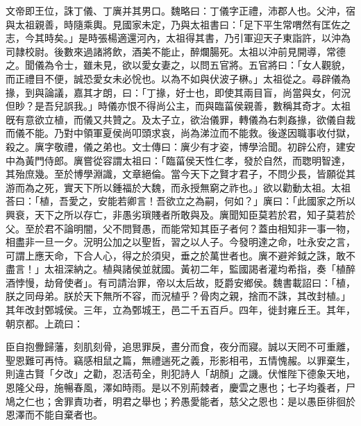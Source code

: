 \begin{pinyinscope}
文帝即王位，誅丁儀、丁廙并其男口。魏略曰：丁儀字正禮，沛郡人也。父沖，宿與太祖親善，時隨乘輿。見國家未定，乃與太祖書曰：「足下平生常喟然有匡佐之志，今其時矣。」是時張楊適還河內，太祖得其書，乃引軍迎天子東詣許，以沖為司隷校尉。後數來過諸將飲，酒美不能止，醉爛腸死。太祖以沖前見開導，常德之。聞儀為令士，雖未見，欲以愛女妻之，以問五官將。五官將曰：「女人觀貌，而正禮目不便，誠恐愛女未必恱也。以為不如與伏波子楙。」太祖從之。尋辟儀為掾，到與論議，嘉其才朗，曰：「丁掾，好士也，即使其兩目盲，尚當與女，何況但眇？是吾兒誤我。」時儀亦恨不得尚公主，而與臨菑侯親善，數稱其奇才。太祖旣有意欲立植，而儀又共贊之。及太子立，欲治儀罪，轉儀為右刺姦掾，欲儀自裁而儀不能。乃對中領軍夏侯尚叩頭求哀，尚為涕泣而不能救。後遂因職事收付獄，殺之。廙字敬禮，儀之弟也。文士傳曰：廙少有才姿，博學洽聞。初辟公府，建安中為黃門侍郎。廙嘗從容謂太祖曰：「臨菑侯天性仁孝，發於自然，而聦明智達，其殆庶幾。至於博學淵識，文章絕倫。當今天下之賢才君子，不問少長，皆願從其游而為之死，實天下所以鍾福於大魏，而永授無窮之祚也。」欲以勸動太祖。太祖荅曰：「植，吾愛之，安能若卿言！吾欲立之為嗣，何如？」廙曰：「此國家之所以興衰，天下之所以存亡，非愚劣瑣賤者所敢與及。廙聞知臣莫若於君，知子莫若於父。至於君不論明闇，父不問賢愚，而能常知其臣子者何？蓋由相知非一事一物，相盡非一旦一夕。況明公加之以聖哲，習之以人子。今發明達之命，吐永安之言，可謂上應天命，下合人心，得之於須臾，垂之於萬世者也。廙不避斧鉞之誅，敢不盡言！」太祖深納之。植與諸侯並就國。黃初二年，監國謁者灌均希指，奏「植醉酒悖慢，劫脅使者」。有司請治罪，帝以太后故，貶爵安鄉侯。魏書載詔曰：「植，朕之同母弟。朕於天下無所不容，而況植乎？骨肉之親，捨而不誅，其改封植。」其年改封鄄城侯。三年，立為鄄城王，邑二千五百戶。四年，徙封雍丘王。其年，朝京都。上疏曰：

臣自抱釁歸藩，刻肌刻骨，追思罪戾，晝分而食，夜分而寢。誠以天罔不可重離，聖恩難可再恃。竊感相鼠之篇，無禮遄死之義，形影相弔，五情愧赧。以罪棄生，則違古賢「夕改」之勸，忍活苟全，則犯詩人「胡顏」之譏。伏惟陛下德象天地，恩隆父母，施暢春風，澤如時雨。是以不別荊棘者，慶雲之惠也；七子均養者，尸鳩之仁也；舍罪責功者，明君之舉也；矜愚愛能者，慈父之恩也：是以愚臣徘徊於恩澤而不能自棄者也。


\end{pinyinscope}
